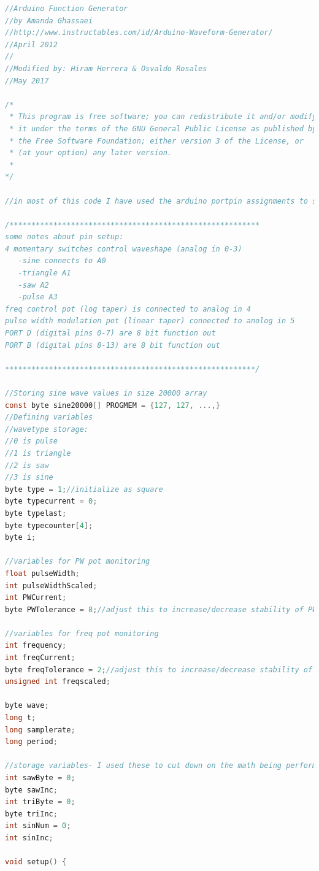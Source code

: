 \documentclass[11pt]{article}
\begin{document}
\begin{lstlisting}[language=C, caption=Código implementado para el generador de funciones, label = alg:code]
//Arduino Function Generator
//by Amanda Ghassaei
//http://www.instructables.com/id/Arduino-Waveform-Generator/
//April 2012
//
//Modified by: Hiram Herrera & Osvaldo Rosales
//May 2017

/*
 * This program is free software; you can redistribute it and/or modify
 * it under the terms of the GNU General Public License as published by
 * the Free Software Foundation; either version 3 of the License, or
 * (at your option) any later version.
 *
*/

//in most of this code I have used the arduino portpin assignments to send data to pins, you can read more about how that works here: http://www.arduino.cc/en/Reference/PortManipulation

/*********************************************************
some notes about pin setup:
4 momentary switches control waveshape (analog in 0-3)
   -sine connects to A0
   -triangle A1
   -saw A2
   -pulse A3
freq control pot (log taper) is connected to analog in 4
pulse width modulation pot (linear taper) connected to anolog in 5
PORT D (digital pins 0-7) are 8 bit function out
PORT B (digital pins 8-13) are 8 bit function out

*********************************************************/

//Storing sine wave values in size 20000 array
const byte sine20000[] PROGMEM = {127, 127, ...,}
//Defining variables
//wavetype storage:
//0 is pulse
//1 is triangle
//2 is saw
//3 is sine
byte type = 1;//initialize as square
byte typecurrent = 0;
byte typelast;
byte typecounter[4];
byte i;

//variables for PW pot monitoring
float pulseWidth;
int pulseWidthScaled;
int PWCurrent;
byte PWTolerance = 8;//adjust this to increase/decrease stability of PW measurement

//variables for freq pot monitoring
int frequency;
int freqCurrent;
byte freqTolerance = 2;//adjust this to increase/decrease stability of frequency measurement
unsigned int freqscaled;

byte wave;
long t;
long samplerate;
long period;

//storage variables- I used these to cut down on the math being performed during the interrupt
int sawByte = 0;
byte sawInc;
int triByte = 0;
byte triInc;
int sinNum = 0;
int sinInc;

void setup() {
  

\end{lstlisting}
\end{document}

